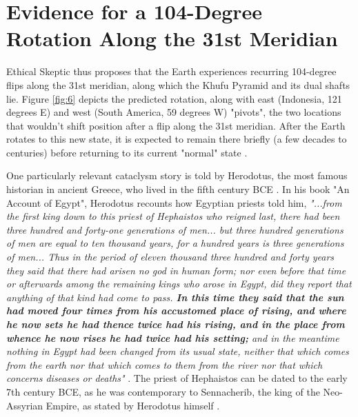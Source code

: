 \documentclass[10pt,twocolumn,letterpaper]{article}
\begin{document}

\section{Evidence for a 104-Degree Rotation Along the 31st Meridian}

Ethical Skeptic thus proposes that the Earth experiences recurring 104-degree flips along the 31st meridian, along which the Khufu Pyramid and its dual shafts lie. Figure \ref{fig:6} depicts the predicted rotation, along with east (Indonesia, 121 degrees E) and west (South America, 59 degrees W) "pivots", the two locations that wouldn't shift position after a flip along the 31st meridian. After the Earth rotates to this new state, it is expected to remain there briefly (a few decades to centuries) before returning to its current "normal" state \cite{150}.

One particularly relevant cataclysm story is told by Herodotus, the most famous historian in ancient Greece, who lived in the fifth century BCE \cite{31}. In his book "An Account of Egypt", Herodotus recounts how Egyptian priests told him, \textit{"...from the first king down to this priest of Hephaistos who reigned last, there had been three hundred and forty-one generations of men... but three hundred generations of men are equal to ten thousand years, for a hundred years is three generations of men... Thus in the period of eleven thousand three hundred and forty years they said that there had arisen no god in human form; nor even before that time or afterwards among the remaining kings who arose in Egypt, did they report that anything of that kind had come to pass. \textbf{In this time they said that the sun had moved four times from his accustomed place of rising, and where he now sets he had thence twice had his rising, and in the place from whence he now rises he had twice had his setting;} and in the meantime nothing in Egypt had been changed from its usual state, neither that which comes from the earth nor that which comes to them from the river nor that which concerns diseases or deaths"} \cite{32}. The priest of Hephaistos can be dated to the early 7th century BCE, as he was contemporary to Sennacherib, the king of the Neo-Assyrian Empire, as stated by Herodotus himself \cite{32,33,34}.
\end{document}
